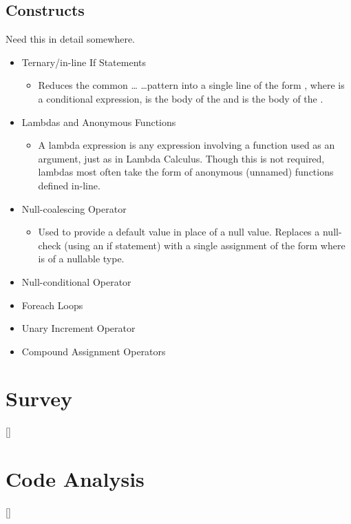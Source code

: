 \documentclass{article}
\begin{document}
    \subsection{Constructs}
    \label{subsec:constructs}
    Need this in detail somewhere.
    \begin{itemize}
        \item Ternary/in-line If Statements
            \begin{itemize}
                \item Reduces the common  \dots {} \dots pattern into a single line of the form , where  is a conditional expression,  is the body of the  and  is the body of the .
            \end{itemize}
        \item Lambdas and Anonymous Functions
            \begin{itemize}
                \item A lambda expression is any expression involving a function used as an argument, just as in Lambda Calculus. Though this is not required, lambdas most often take the form of anonymous (unnamed) functions defined in-line. \citep{javaLambdas}
            \end{itemize}
        \item Null-coalescing Operator
            \begin{itemize}
                \item Used to provide a default value in place of a null value. Replaces a null-check (using an if statement) with a single assignment of the form \newline{} where  is of a nullable type. \citep{gunnerson2012programmer}
            \end{itemize}
        \item Null-conditional Operator
         \item Foreach Loops
        \item Unary Increment Operator
        \item Compound Assignment Operators
    \end{itemize}
\section{Survey}
        []
\section{Code Analysis}
    []
\end{document}
